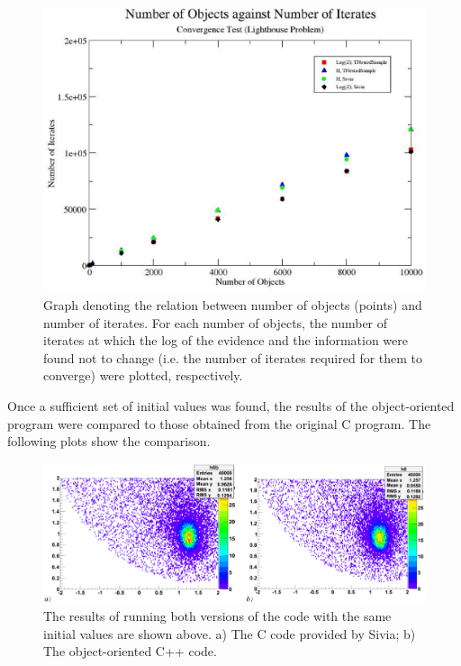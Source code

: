 \documentclass[a4paper,12pt]{article}
\begin{document}
\begin{figure}[!h]
 \begin{center}
  \includegraphics[scale=0.5]{convergence.eps}
  \caption{Graph denoting the relation between number of objects (points) and number of iterates.  For each number of objects, the number of iterates at which the log of the evidence and the information were found not to change (i.e. the number of iterates required for them to converge) were plotted, respectively.}
 \end{center}
\end{figure}



Once a sufficient set of initial values was found, the results of the object-oriented program were compared to those obtained from the original C program.  The following plots show the comparison.  



\begin{figure}[!h]
 \begin{center}
  \includegraphics[scale=0.4]{lighthouseresults.eps}
  \caption{The results of running both versions of the code with the same initial values are shown above.  a) The C code provided by Sivia; b) The object-oriented C++ code.}
 \end{center}
\end{figure}
\end{document}
